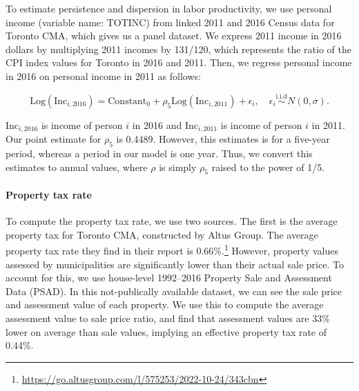 \documentclass[parskip=full]{article}
\begin{document}
To estimate persistence and dispersion in labor productivity, we use personal income (variable name: TOTINC) from linked 2011 and 2016 Census data for Toronto CMA, which gives us a panel dataset. We express 2011 income in 2016 dollars by multiplying 2011 incomes by 131/120, which represents the ratio of the CPI index values for Toronto in 2016 and 2011. Then, we regress personal income in 2016 on personal income in 2011 as follows:

\begin{equation*}
  \mbox{Log} \left(\mbox{Inc}_{i,\mbox{2016}}\right) = \mbox{Constant}_{0}+\rho_{5} \mbox{Log} \left(\mbox{Inc}_{i,\mbox{2011}}\right) + \epsilon_{i},\quad \epsilon_{i}\overset{\mathrm{i.i.d}}\sim N(0,\sigma).
\end{equation*}

\noindent $\mbox{Inc}_{i,\mbox{2016}}$ is income of person $i$ in 2016 and $\mbox{Inc}_{i,\mbox{2011}}$ is income of person $i$ in 2011. Our point estimate for $\rho_{5}$ is 0.4489. However, this estimates is for a five-year period, whereas a period in our model is one year. Thus, we convert this estimates to annual values, where $\rho$ is simply $\rho_{5}$ raised to the power of 1/5.

\paragraph{Property tax rate}

To compute the property tax rate, we use two sources. The first is the average property tax for Toronto CMA, constructed by Altus Group. The average property tax rate they find in their report is 0.66\%.\footnote{\url{https://go.altusgroup.com/l/575253/2022-10-24/343cbn}} However, property values assessed by municipalities are significantly lower than their actual sale price. To account for this, we use house-level 1992--2016 Property Sale and Assessment Data (PSAD). In this not-publically available dataset, we can see the sale price and assessment value of each property. We use this to compute the average assessment value to sale price ratio, and find that assessment values are 33\% lower on average than sale values, implying an effective property tax rate of 0.44\%.

\end{document}
